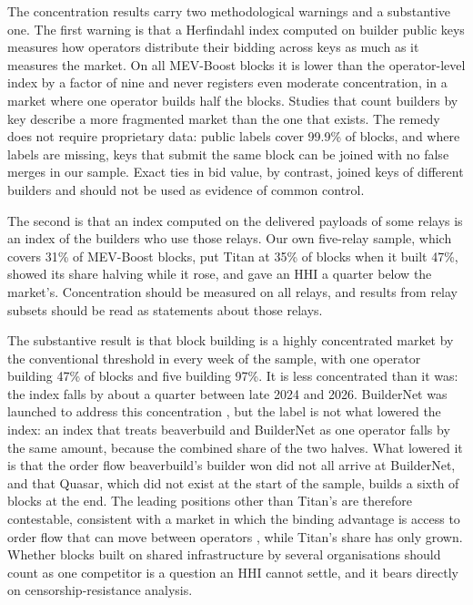 \documentclass[11pt]{article}
\begin{document}
The concentration results carry two methodological warnings and a
substantive one. The first warning is that a Herfindahl index computed on
builder public keys measures how operators distribute their bidding across
keys as much as it measures the market. On all MEV-Boost blocks it is lower
than the operator-level index by a factor of nine and never registers even
moderate concentration, in a market where one operator builds half the
blocks. Studies that count builders by key describe a more fragmented
market than the one that exists.
The remedy does not require proprietary data: public labels cover 99.9\% of
blocks, and where labels are missing, keys that submit the same block can
be joined with no false merges in our sample. Exact ties in bid value, by
contrast, joined keys of different builders and should not be used as
evidence of common control.

The second is that an index computed on the delivered payloads of some
relays is an index of the builders who use those relays. Our own five-relay
sample, which covers 31\% of MEV-Boost blocks, put Titan at 35\% of blocks
when it built 47\%, showed its share halving while it rose, and gave an HHI
a quarter below the market's. Concentration should be measured on
all relays, and results from relay subsets should be read as statements
about those relays.

The substantive result is that block building is a highly concentrated
market by the conventional threshold in every week of the sample, with one
operator building 47\% of blocks and five building 97\%. It is less
concentrated than it was: the index falls by about a quarter between late
2024 and 2026. BuilderNet was launched to address this concentration
\citep{buildernet2024}, but the label is not what lowered the index: an
index that treats beaverbuild and BuilderNet as one operator falls by the
same amount, because the combined share of the two halves. What lowered it
is that the order flow beaverbuild's builder won did not all arrive at
BuilderNet, and that Quasar, which did not exist at the start of the
sample, builds a sixth of blocks at the end. The leading positions other
than Titan's are therefore contestable, consistent with a market in which
the binding advantage is access to order flow that can move between
operators \citep{wu2025,oz2024}, while Titan's share has only grown. Whether
blocks built on shared infrastructure by several organisations should count
as one competitor is a question an HHI cannot settle, and it bears directly
on censorship-resistance analysis.
\end{document}
